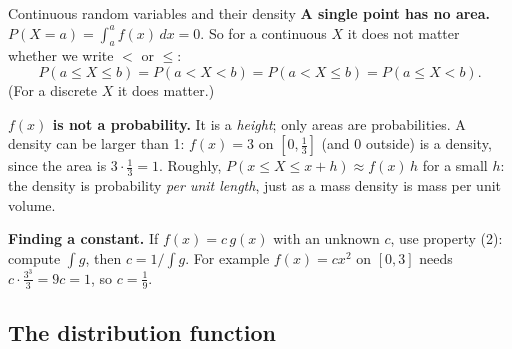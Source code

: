 \begin{key}{Continuous random variables and their density}
	\textbf{A single point has no area.} $P(X=a)=\int_a^a f(x)\,dx=0$. So for
	a continuous $X$ it does not matter whether we write $<$ or $\le$:
	\[ P(a\le X\le b)=P(a<X<b)=P(a<X\le b)=P(a\le X<b). \]
	(For a discrete $X$ it does matter.)

	\textbf{$f(x)$ is not a probability.} It is a \emph{height}; only areas
	are probabilities. A density can be larger than 1: $f(x)=3$ on
	$[0,\frac13]$ (and 0 outside) is a density, since the area is
	$3\cdot\frac13=1$. Roughly, $P(x\le X\le x+h)\approx f(x)\,h$ for a small
	$h$: the density is probability \emph{per unit length}, just as a mass
	density is mass per unit volume.

	\textbf{Finding a constant.} If $f(x)=c\,g(x)$ with an unknown $c$, use
	property (2): compute $\int g$, then $c=1/\!\int g$. For example
	$f(x)=cx^2$ on $[0,3]$ needs $c\cdot\frac{3^3}{3}=9c=1$, so $c=\frac19$.
\end{key}


\subsection*{The distribution function}

